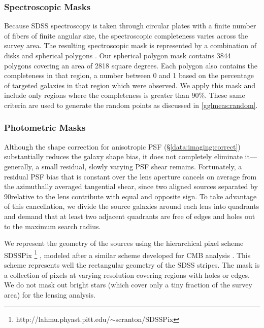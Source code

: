 \documentclass{emulateapj}
\begin{document}
\begin{figure}[tp]
 
\end{figure}


\subsubsection{Spectroscopic Masks} \label{data:spectro:sphpolymasks}

Because SDSS spectroscopy is taken through circular plates with a finite 
number of fibers of finite angular size, the spectroscopic completeness varies 
across the survey area. The resulting spectroscopic mask 
is represented by a
combination of disks and spherical polygons \citep{Tegmark04}.  Our spherical
polygon mask contains 3844 polygons covering an area of 2818 square degrees.
Each polygon also contains the completeness in that region, a number
between 0 and 1 based on the percentage of targeted galaxies in that
region which were observed.  We apply this mask and include only regions 
where the completeness is 
greater than 90\%.  These same criteria are used to generate the random points
as discussed in \ref{gglmeas:random}.

\subsubsection{Photometric Masks} \label{data:spectro:pixelmasks}

Although the shape correction for anisotropic PSF (\S \ref{data:imaging:correct}) 
substantially reduces the galaxy shape bias, it does not completely eliminate 
it---generally, a small residual, slowly varying PSF shear remains.  
Fortunately, a residual PSF bias that is constant over the lens 
aperture cancels on average from the azimuthally averaged tangential 
shear, since two aligned sources separated by 90\degr relative to the lens 
contribute with equal and opposite sign. To take advantage of this
cancellation, we divide the source galaxies around each lens into 
quadrants and demand that at least two
adjacent quadrants are free of edges and holes out to the
maximum search radius.

We represent the geometry of the sources using the hierarchical pixel scheme
SDSSPix 
\footnote{http://lahmu.phyast.pitt.edu/$\sim$scranton/SDSSPix} 
\citep{Scranton03}, 
modeled after a similar scheme developed for CMB analysis
\citep{Gorski98}. This scheme represents well the rectangular
geometry of the SDSS stripes.  The mask is a collection of pixels at varying
resolution covering regions with holes or edges.  We do not mask out bright 
stars (which cover only a tiny fraction of the survey area) 
for the lensing analysis.
\end{document}
